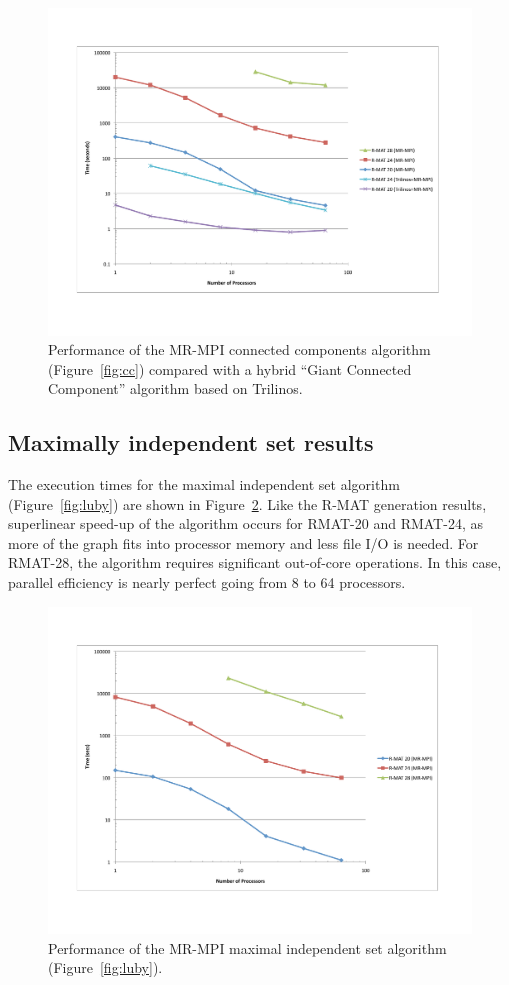 \begin{figure}[htb]
\includegraphics[width=\textwidth]{fig_cc.pdf}
\caption{Performance of the MR-MPI connected components algorithm (Figure~\ref{fig:cc}) compared with a hybrid ``Giant Connected Component'' algorithm based
on Trilinos.}
\label{f:cc}
\end{figure}

\subsection{Maximally independent set results}

The execution times for the maximal independent set algorithm
(Figure~\ref{fig:luby}) are shown in Figure~\ref{f:luby}.  Like the
R-MAT generation results, superlinear speed-up of the algorithm occurs
for RMAT-20 and RMAT-24, as more of the graph fits into processor
memory and less file I/O is needed.  For RMAT-28, the algorithm
requires significant out-of-core operations. In this case, parallel
efficiency is nearly perfect going from 8 to 64 processors.

\begin{figure}[htb]
\includegraphics[width=\textwidth]{fig_luby.pdf}
\caption{Performance of the MR-MPI maximal independent set algorithm (Figure~\ref{fig:luby}).}
\label{f:luby}
\end{figure}

